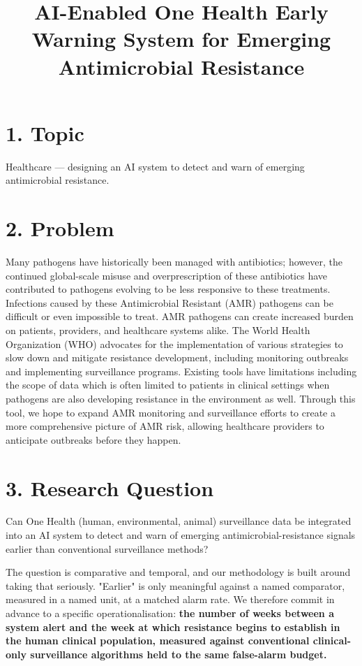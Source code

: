\documentclass[11pt,a4paper]{article}
\title{AI-Enabled One Health Early Warning System for Emerging Antimicrobial Resistance}
\date{}
\begin{document}
\maketitle
\section*{1. Topic}

Healthcare — designing an AI system to detect and warn of emerging antimicrobial resistance.

\section*{2. Problem}

Many pathogens have historically been managed with antibiotics; however, the continued global-scale misuse and overprescription of these antibiotics have contributed to pathogens evolving to be less responsive to these treatments. Infections caused by these Antimicrobial Resistant (AMR) pathogens can be difficult or even impossible to treat. AMR pathogens can create increased burden on patients, providers, and healthcare systems alike. The World Health Organization (WHO) advocates for the implementation of various strategies to slow down and mitigate resistance development, including monitoring outbreaks and implementing surveillance programs. Existing tools have limitations including the scope of data which is often limited to patients in clinical settings when pathogens are also developing resistance in the environment as well. Through this tool, we hope to expand AMR monitoring and surveillance efforts to create a more comprehensive picture of AMR risk, allowing healthcare providers to anticipate outbreaks before they happen.

\section*{3. Research Question}

Can One Health (human, environmental, animal) surveillance data be integrated into an AI system to detect and warn of emerging antimicrobial-resistance signals earlier than conventional surveillance methods?

The question is comparative and temporal, and our methodology is built around taking that seriously. "Earlier" is only meaningful against a named comparator, measured in a named unit, at a matched alarm rate. We therefore commit in advance to a specific operationalisation: \textbf{the number of weeks between a system alert and the week at which resistance begins to establish in the human clinical population, measured against conventional clinical-only surveillance algorithms held to the same false-alarm budget.}
\end{document}
